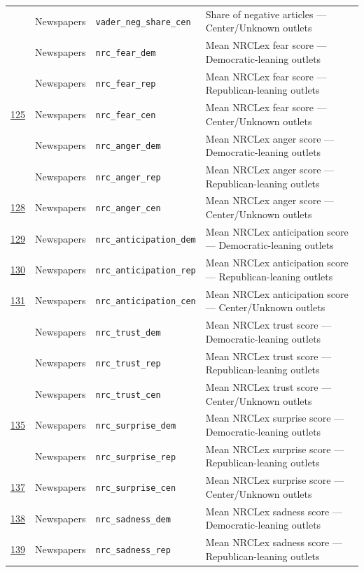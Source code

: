 \begin{longtable}{>{\centering\arraybackslash}p{0.9cm} p{2cm} p{4cm} p{7.5cm}}
122 & Newspapers & \texttt{vader\_neg\_share\_cen} & Share of negative articles --- Center/Unknown outlets \\
123 & Newspapers & \texttt{nrc\_fear\_dem} & Mean NRCLex fear score --- Democratic-leaning outlets \\
124 & Newspapers & \texttt{nrc\_fear\_rep} & Mean NRCLex fear score --- Republican-leaning outlets \\
\underline{125} & Newspapers & \texttt{nrc\_fear\_cen} & Mean NRCLex fear score --- Center/Unknown outlets \\
126 & Newspapers & \texttt{nrc\_anger\_dem} & Mean NRCLex anger score --- Democratic-leaning outlets \\
127 & Newspapers & \texttt{nrc\_anger\_rep} & Mean NRCLex anger score --- Republican-leaning outlets \\
\underline{128} & Newspapers & \texttt{nrc\_anger\_cen} & Mean NRCLex anger score --- Center/Unknown outlets \\
\underline{129} & Newspapers & \texttt{nrc\_anticipation\_dem} & Mean NRCLex anticipation score --- Democratic-leaning outlets \\
\underline{130} & Newspapers & \texttt{nrc\_anticipation\_rep} & Mean NRCLex anticipation score --- Republican-leaning outlets \\
\underline{131} & Newspapers & \texttt{nrc\_anticipation\_cen} & Mean NRCLex anticipation score --- Center/Unknown outlets \\
132 & Newspapers & \texttt{nrc\_trust\_dem} & Mean NRCLex trust score --- Democratic-leaning outlets \\
133 & Newspapers & \texttt{nrc\_trust\_rep} & Mean NRCLex trust score --- Republican-leaning outlets \\
134 & Newspapers & \texttt{nrc\_trust\_cen} & Mean NRCLex trust score --- Center/Unknown outlets \\
\underline{135} & Newspapers & \texttt{nrc\_surprise\_dem} & Mean NRCLex surprise score --- Democratic-leaning outlets \\
136 & Newspapers & \texttt{nrc\_surprise\_rep} & Mean NRCLex surprise score --- Republican-leaning outlets \\
\underline{137} & Newspapers & \texttt{nrc\_surprise\_cen} & Mean NRCLex surprise score --- Center/Unknown outlets \\
\underline{138} & Newspapers & \texttt{nrc\_sadness\_dem} & Mean NRCLex sadness score --- Democratic-leaning outlets \\
\underline{139} & Newspapers & \texttt{nrc\_sadness\_rep} & Mean NRCLex sadness score --- Republican-leaning outlets \\

\end{longtable}
